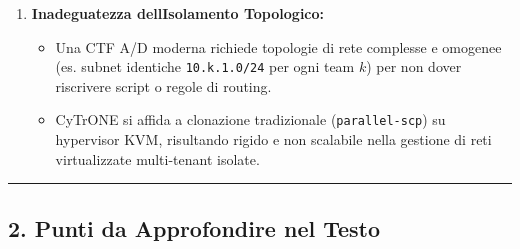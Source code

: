 \begin{enumerate}
  \begin{itemize}
  \tightlist
  \item
    Durante una CTF è frequente che un concorrente renda instabile il
    proprio sistema e necessiti di un ripristino.
  \item
    CyTrONE impiega minuti (fino a 8+ minuti per scenari base con sole 2
    VM) e degrada esponenzialmente con l\textquotesingle aumentare dei
    nodi.
  \item
    BlueAgent garantisce provisioning e rollback in
    \textbf{\textasciitilde100--500 ms} grazie all\textquotesingle uso
    di container di sistema Incus/LXC e snapshot a livello di blocco
    (ZFS/Btrfs).
  \end{itemize}
\item
  \textbf{Inadeguatezza dell\textquotesingle Isolamento Topologico:}

  \begin{itemize}
  \tightlist
  \item
    Una CTF A/D moderna richiede topologie di rete complesse e omogenee
    (es. subnet identiche \passthrough{\lstinline!10.k.1.0/24!} per ogni
    team \(k\)) per non dover riscrivere script o regole di routing.
  \item
    CyTrONE si affida a clonazione tradizionale
    (\passthrough{\lstinline!parallel-scp!}) su hypervisor KVM,
    risultando rigido e non scalabile nella gestione di reti
    virtualizzate multi-tenant isolate.
  \end{itemize}
\end{enumerate}

\begin{center}\rule{0.5\linewidth}{0.5pt}\end{center}

\subsection{2. Punti da Approfondire nel
Testo}\label{2-punti-da-approfondire-nel-testo}

